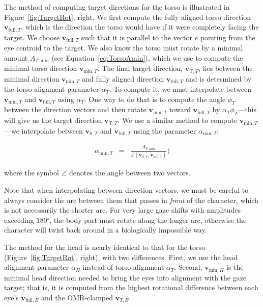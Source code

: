 The method of computing target directions for the torso is illustrated in Figure~\ref{fig:TargetRot}, right. We first compute the fully aligned torso direction $\mathbf{v}_{\mathrm{full},T}$, which is the direction the torso would have if it were completely facing the target. We choose $\mathbf{v}_{\mathrm{full},T}$ such that it is parallel to the vector $e$ pointing from the eye centroid to the target. We also know the torso must rotate by a minimal amount $A_{T,\mathrm{min}}$ (see Equation~\ref{eq:TorsoAmin}), which we use to compute the minimal torso direction $\mathbf{v}_{\mathrm{min},T}$. The final target direction, $\mathbf{v}_{\mathrm{T},T}$, lies between the minimal direction $\mathbf{v}_{\mathrm{min},T}$ and fully aligned direction $\mathbf{v}_{\mathrm{full},T}$ and is determined by the torso alignment parameter $\alpha_T$. To compute it, we must interpolate between $\mathbf{v}_{\mathrm{min},T}$ and $\mathbf{v}_{\mathrm{full},T}$ using $\alpha_T$. One way to do that is to compute the angle $\phi_T$ between the direction vectors and then rotate $\mathbf{v}_{\mathrm{min},T}$ toward $\mathbf{v}_{\mathrm{full},T}$ by $\alpha_T \phi_T$---this will give us the target direction $\mathbf{v}_{\mathrm{T},T}$. We use a similar method to compute $\mathbf{v}_{\mathrm{min},T}$---we interpolate between $\mathbf{v}_{\mathrm{S},T}$ and $\mathbf{v}_{\mathrm{full},T}$ using the parameter $\alpha_{\mathrm{min},T}$:

\begin{align}
\label{eq:TorsoMinRotParam}
\alpha_{\mathrm{min},T} &=& \frac{A_{T,\mathrm{min}}}{\angle(\mathbf{v}_{S,T}, \mathbf{v}_{\mathrm{full},T})})
\end{align}

where the symbol $\angle$ denotes the angle between two vectors.

Note that when interpolating between direction vectors, we must be careful to always consider the arc between them that passes in \emph{front} of the character, which is not necessarily the shorter arc. For very large gaze shifts with amplitudes exceeding 180$^\circ$, the body part must rotate along the longer arc, otherwise the character will twist back around in a biologically impossible way.

The method for the head is nearly identical to that for the torso (Figure~\ref{fig:TargetRot}, right), with two differences. First, we use the head alignment parameter $\alpha_H$ instead of torso alignment $\alpha_T$. Second, $\mathbf{v}_{\mathrm{min},H}$ is the minimal head direction needed to bring the eyes into alignment with the gaze target; that is, it is computed from the highest rotational difference between each eye's $\mathbf{v}_{\mathrm{full},E}$ and the OMR-clamped $\mathbf{v}_{T,E}$.

